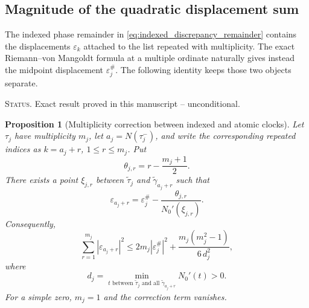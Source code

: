 \documentclass[11pt]{amsart}
\numberwithin{equation}{section}
\theoremstyle{plain}
\newtheorem{proposition}[theorem]{Proposition}
\theoremstyle{definition}
\theoremstyle{remark}
\newcommand{\1}{\mathbf{1}}
\newcommand{\statusnote}[1]{%
  \par\smallskip\noindent
  \begingroup\footnotesize\textsc{Status.} #1\endgroup
  \par\smallskip}
\begin{document}
\subsection{Magnitude of the quadratic displacement sum}
\label{subsec:rvm_displacement_square_size}

The indexed phase remainder in \eqref{eq:indexed_discrepancy_remainder}
contains the displacements \(\varepsilon_k\) attached to the list repeated
with multiplicity.  The exact Riemann--von Mangoldt formula at a multiple
ordinate naturally gives instead the midpoint displacement
\(\varepsilon_j^{\#}\).  The following identity keeps those two objects
separate.

\statusnote{Exact result proved in this manuscript -- unconditional.}
\begin{proposition}[Multiplicity correction between indexed and atomic clocks]
\label{prop:multiplicity_clock_correction}
Let \(\tau_j\) have multiplicity \(m_j\), let
\(a_j=N(\tau_j^-)\), and write the corresponding repeated indices as
\(k=a_j+r\), \(1\leq r\leq m_j\).  Put
\begin{equation}
\theta_{j,r}=r-\frac{m_j+1}{2}.
\label{eq:multiplicity_centered_rank}
\end{equation}
There exists a point \(\xi_{j,r}\) between
\(\widetilde\tau_j\) and \(\widetilde\gamma_{a_j+r}\) such that
\begin{equation}
\boxed{
\varepsilon_{a_j+r}
=
\varepsilon_j^{\#}
-
\frac{\theta_{j,r}}{N_0'(\xi_{j,r})}.
}
\label{eq:indexed_atomic_displacement_relation}
\end{equation}
Consequently,
\begin{equation}
\sum_{r=1}^{m_j}|\varepsilon_{a_j+r}|^2
\leq
2m_j|\varepsilon_j^{\#}|^2
+
\frac{m_j(m_j^2-1)}{6\,d_j^2},
\label{eq:multiplicity_square_correction}
\end{equation}
where
\begin{equation}
d_j=
\min_{t\text{ between }\widetilde\tau_j
\text{ and all }\widetilde\gamma_{a_j+r}}N_0'(t)>0.
\label{eq:multiplicity_min_derivative}
\end{equation}
For a simple zero, \(m_j=1\) and the correction term vanishes.
\end{proposition}
\end{document}
